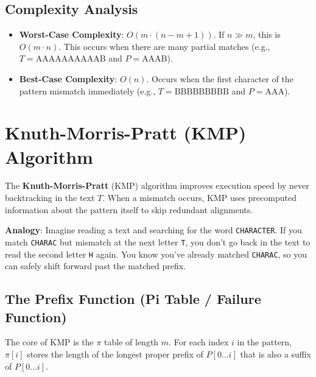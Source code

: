 \documentclass[11pt,a4paper]{article}
\begin{document}
\subsection{Complexity Analysis}
\begin{itemize}
  \item \textbf{Worst-Case Complexity}: $O(m \cdot (n - m + 1))$. If $n \gg m$, this is $O(m \cdot n)$. This occurs when there are many partial matches (e.g., $T = \text{AAAAAAAAAAB}$ and $P = \text{AAAB}$).
  \item \textbf{Best-Case Complexity}: $O(n)$. Occurs when the first character of the pattern mismatch immediately (e.g., $T = \text{BBBBBBBBB}$ and $P = \text{AAA}$).
\end{itemize}

\section{Knuth-Morris-Pratt (KMP) Algorithm}

The \textbf{Knuth-Morris-Pratt} (KMP) algorithm improves execution speed by never backtracking in the text $T$. When a mismatch occurs, KMP uses precomputed information about the pattern itself to skip redundant alignments.

\begin{notebox}
  \textbf{Analogy}:
  Imagine reading a text and searching for the word \texttt{CHARACTER}. If you match \texttt{CHARAC} but mismatch at the next letter \texttt{T}, you don't go back in the text to read the second letter \texttt{H} again. You know you've already matched \texttt{CHARAC}, so you can safely shift forward past the matched prefix.
\end{notebox}

\subsection{The Prefix Function (Pi Table / Failure Function)}
The core of KMP is the $\pi$ table of length $m$. For each index $i$ in the pattern, $\pi[i]$ stores the length of the longest proper prefix of $P[0 \dots i]$ that is also a suffix of $P[0 \dots i]$.
\end{document}
